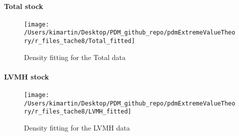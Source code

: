 \paragraph{Total stock}
\begin{figure}[h!]
	\centering
	\texttt{[image: /Users/kimartin/Desktop/PDM\_github\_repo/pdmExtremeValueTheory/r\_files\_tache8/Total\_fitted]}
	\caption{Density fitting for the Total data \\}
	\label{fig:dataAboveThresholdtotalFitted}
\end{figure}
\paragraph{LVMH stock}
\begin{figure}[h!]
	\centering
	\texttt{[image: /Users/kimartin/Desktop/PDM\_github\_repo/pdmExtremeValueTheory/r\_files\_tache8/LVMH\_fitted]}
	\caption{Density fitting for the LVMH data \\}
	\label{fig:dataAboveThresholdLVMHFitted}
\end{figure}